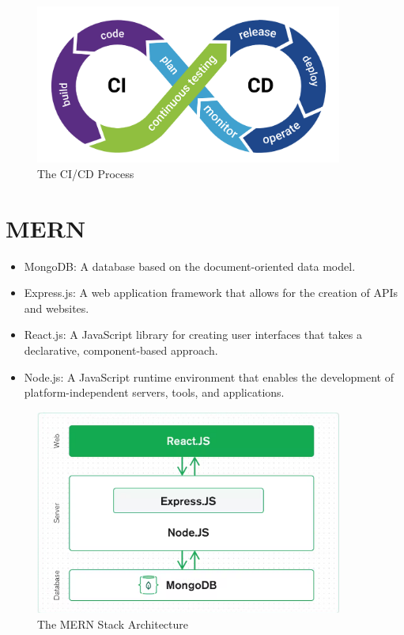 \begin{figure}[h!]
    \centering
    \includegraphics[width=0.9\textwidth]{images/CICD.png}
    \caption{The CI/CD Process}
    \label{image:cicd}
\end{figure}

\chapter{MERN}\label{appendix:mern}
\begin{itemize}
\item MongoDB: A database based on the document-oriented data model.
\item Express.js: A web application framework that allows for the creation of APIs and websites.
\item React.js: A JavaScript library for creating user interfaces that takes a declarative, component-based approach.
\item Node.js: A JavaScript runtime environment that enables the development of platform-independent servers, tools, and applications.
\end{itemize}

\begin{figure}[h!]
    \centering
    \includegraphics[width=0.9\textwidth]{images/mern.png}
    \caption{The MERN Stack Architecture}
    \label{image:mern}
\end{figure}

